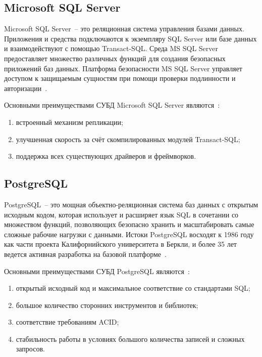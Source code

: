\subsection{Microsoft SQL Server}

Microsoft SQL Server~-- это реляционная система управления базами данных.
Приложения и средства подключаются к экземпляру SQL Server или базе данных и взаимодействуют с помощью Transact-SQL.
Среда MS SQL Server предоставляет множество различных функций для создания безопасных приложений баз данных. 
Платформа безопасности MS SQL Server управляет доступом к защищаемым сущностям при помощи проверки подлинности и авторизации~\cite{mssql, allDBs}.

Основными преимуществами СУБД Microsoft SQL Server являются~\cite{cmpSCDB5}:
\begin{enumerate}
	\item встроенный механизм репликации;
	\item улучшенная скорость за счёт скомпилированных модулей Transact-SQL;
	\item поддержка всех существующих драйверов и фреймворков.
\end{enumerate}

\subsection{PostgreSQL}

PostgreSQL~-- это мощная объектно-реляционная система баз данных с открытым исходным кодом, которая использует и расширяет язык SQL в сочетании со множеством функций, позволяющих безопасно хранить и масштабировать самые сложные рабочие нагрузки с данными.
Истоки PostgreSQL восходят к 1986 году как части проекта Калифорнийского университета в Беркли, и более 35 лет ведется активная разработка на базовой платформе~\cite{postgresql}.

Основными преимуществами СУБД PostgreSQL являются~\cite{cmpSCDB1, cmpSCDB2, cmpSCDB3}:
\begin{enumerate}
	\item открытый исходный код и максимальное соответствие со стандартами SQL;
	\item большое количество сторонних инструментов и библиотек;
	\item соответствие требованиям ACID;
	\item стабильность работы в условиях большого количества записей и сложных запросов.
\end{enumerate}

